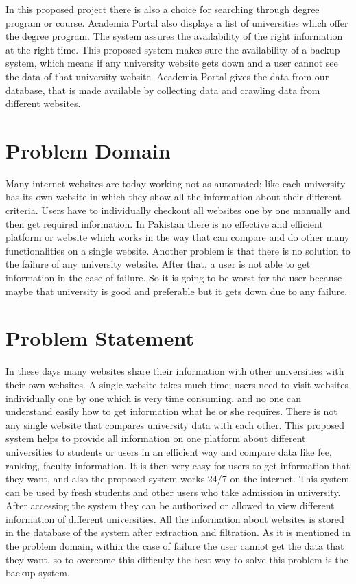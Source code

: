 In this proposed project there is also a choice for searching through degree program or course. Academia Portal also displays a list of universities which offer the degree program. The system assures the availability of the right information at the right time. This proposed system makes sure the availability of a backup system, which means if any university website gets down and a user cannot see the data of that university website. Academia Portal gives the data from our database, that is made available by collecting data and crawling data from different websites.

\section{Problem Domain}

Many internet websites are today working not as automated; like each university has its own website in which they show all the information about their different criteria. Users have to individually checkout all websites one by one manually and then get required information. In Pakistan there is no effective and efficient platform or website which works in the way that can compare and do other many functionalities on a single website. Another problem is that there is no solution to the failure of any university website. After that, a user is not able to get information in the case of failure. So it is going to be worst for the user because maybe that university is good and preferable but it gets down due to any failure.

\section{Problem Statement}

In these days many websites share their information with other universities with their own websites. A single website takes much time; users need to visit websites individually one by one which is very time consuming, and no one can understand easily how to get information what he or she requires. There is not any single website that compares university data with each other. This proposed system helps to provide all information on one platform about different universities to students or users in an efficient way and compare data like fee, ranking, faculty information. It is then very easy for users to get information that they want, and also the proposed system works 24/7 on the internet. This system can be used by fresh students and other users who take admission in university. After accessing the system they can be authorized or allowed to view different information of different universities. All the information about websites is stored in the database of the system after extraction and filtration. As it is mentioned in the problem domain, within the case of failure the user cannot get the data that they want, so to overcome this difficulty the best way to solve this problem is the backup system.

